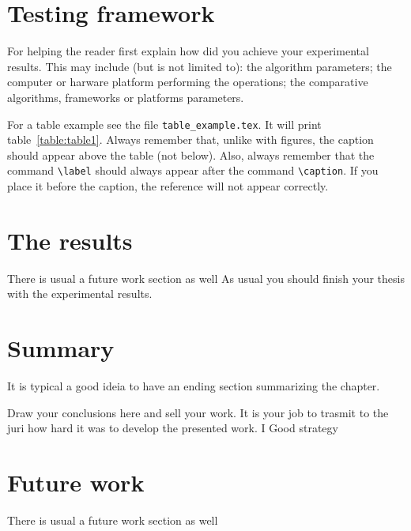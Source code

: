 \documentclass[defaultstyle,10pt,master,Helvetica]{thesis}
\begin{document}
\section{Testing framework}
For helping the reader first explain how did you achieve your experimental results. This may include (but is not limited to): the algorithm parameters; the computer or harware platform performing the operations; the comparative algorithms, frameworks or platforms parameters.



For a table example see the file \verb"table_example.tex". It will print table~\ref{table:table1}. Always remember that, unlike with figures, the caption should appear above the table (not below). Also, always remember that the command \verb"\label" should always appear after the command \verb"\caption". If you place it before the caption, the reference will not appear correctly.

\section{The results}
There is usual a future work section as well
As usual you should finish your thesis with the experimental results.

\section{Summary}

It is typical a good ideia to have an ending section summarizing the chapter.

\cleardoublepage

Draw your conclusions here and sell your work. It is your job to trasmit to the juri how hard it was to develop the presented work. I Good strategy 


\section{Future work}
There is usual a future work section as well

\cleardoublepage
\end{document}
